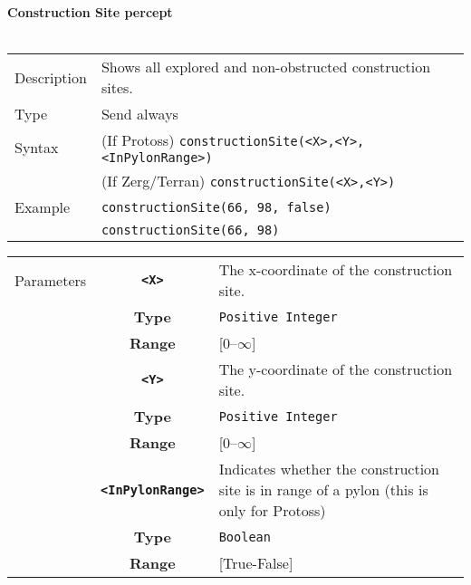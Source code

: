 \noindent
\textbf{Construction Site percept}\\
\\
\begin{tabularx}{\textwidth}{lX}
 Description & Shows all explored and non-obstructed construction sites. \\
 Type & Send always \\
 Syntax & (If Protoss) \verb|constructionSite(<X>,<Y>,<InPylonRange>)| \\
        & (If Zerg/Terran) \verb|constructionSite(<X>,<Y>)| \\
 Example & \verb|constructionSite(66, 98, false)| \\
         & \verb|constructionSite(66, 98)| \\
 \end{tabularx}
 \begin{tabularx}{\textwidth}{l | c | p{8cm}|}
 \cline{2-3}
 Parameters & \textbf{\verb|<X>|} & The x-coordinate of the construction site.\\
            & \textbf{Type} & \verb|Positive Integer| \\
            & \textbf{Range} & [0--$\infty$] \\
            \cline{2-3}
            & \textbf{\verb|<Y>|} & The y-coordinate of the construction site.\\
            & \textbf{Type} & \verb|Positive Integer| \\
            & \textbf{Range} & [0--$\infty$] \\
            \cline{2-3}
            & \textbf{\verb|<InPylonRange>|} & Indicates whether the construction site is in range of a pylon (this is only for Protoss)\\
            & \textbf{Type} & \verb|Boolean| \\
            & \textbf{Range} & [True-False] \\
            \cline{2-3}
\end{tabularx} \\